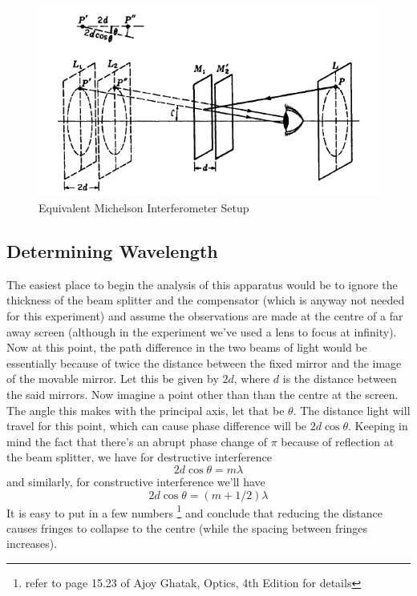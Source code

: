 	\par
	\begin{figure}[bth]
		\begin{center}
			\includegraphics[width=1.1\linewidth]{gfx/e1}
		\end{center}
	\caption[Equivalent Michelson Interferometer Setup]{Equivalent Michelson Interferometer Setup}
	\label{e1}
	\end{figure}

	\subsection{Determining Wavelength}
		The easiest place to begin the analysis of this apparatus would be to ignore the thickness of the beam splitter and the compensator (which is anyway not needed for this experiment) and assume the observations are made at the centre of a far away screen (although in the experiment we've used a lens to focus at infinity). Now at this point, the path difference in the two beams of light would be essentially because of twice the distance between the fixed mirror and the image of the movable mirror. Let this be given by $2d$, where $d$ is the distance between the said mirrors. Now imagine a point other than than the centre at the screen. The angle this makes with the principal axis, let that be $\theta$. The distance light will travel for this point, which can cause phase difference will be $2d \cos{\theta}$. Keeping in mind the fact that there's an abrupt phase change of $\pi$ because of reflection at the beam splitter, we have for destructive interference
		\begin{equation}
			2d\cos{\theta}=m\lambda
		\end{equation}
		and similarly, for constructive interference we'll have
		\begin{equation}
			2d\cos{\theta}=(m+1/2)\lambda
		\end{equation}
		It is easy to put in a few numbers \footnote{refer to page 15.23 of Ajoy Ghatak, Optics, 4th Edition for details} and conclude that reducing the distance causes fringes to collapse to the centre (while the spacing between fringes increases).

